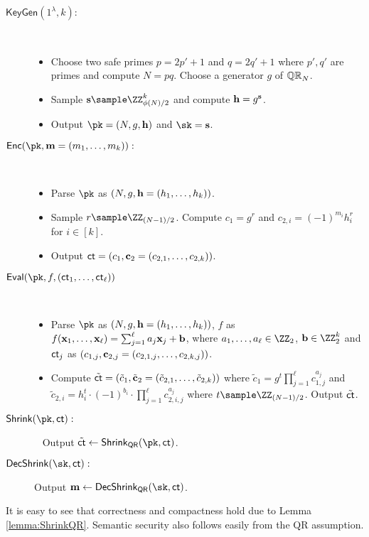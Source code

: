 \begin{description}
\item[$\mathsf{KeyGen}(1^\lambda,k):$]~
\begin{itemize}
    \item Choose two safe primes $p=2p'+1$ and $q=2q'+1$ where $p',q'$ are primes and compute $N=pq$. Choose a generator $g$ of $\mathbb{QR}_N$.
    \item Sample $\sn\sample \ZZ_{\phi(N)/2}^k$ and compute $\mathbf{h}=g^{\mathbf{s}}$.
    \item Output $\pk=(N,g,\hn)$ and $\sk=\sn$.
\end{itemize}

\item[$\mathsf{Enc}(\pk,\mn=(m_1,\dots, m_k)):$]~
\begin{itemize}
    \item Parse $\pk$ as $(N,g,\mathbf{h}=(h_1,\dots ,h_k))$.
    \item Sample $r\sample \ZZ_{(N-1)/2}$. Compute $c_1=g^r$ and $c_{2,i}=(-1)^{m_i}h_i^r$ for $i\in[k]$.
    \item Output $\mathsf{ct}=(c_1,\mathbf{c}_2=(c_{2,1},\dots,c_{2,k}) )$.
\end{itemize}

\item[$\mathsf{Eval}(\pk,f, (\ct_1,\dots, \ct_\ell))$]~
\begin{itemize}
    \item Parse $\pk$ as $(N,g,\mathbf{h}=(h_1,\dots ,h_k))$, $f$ as $f(\mathbf{x}_1,\dots, \mathbf{x}_\ell)=\sum_{j=1}^\ell a_j\mathbf{x}_j+\mathbf{b}$, where $a_1,\dots,a_\ell\in \ZZ_2$, $\bn\in\ZZ_2^k$ and $\mathsf{ct}_j$ as $(c_{1,j},\mathbf{c}_{2,j}=(c_{2,1,j},\dots,c_{2,k,j}) )$.%
    \item Compute $\tilde {\mathsf{ct}}=(\tilde c_1,\tilde {\mathbf{c}}_2=(\tilde c_{2,1},\dots,\tilde c_{2,k} ))$ where $\tilde c_1=g^t\prod_{j=1}^\ell c_{1,j}^{a_j}$ and $\tilde c_{2,i}=h_i^t\cdot(-1)^{b_i}\cdot\prod_{j=1}^\ell c_{2,i,j}^{a_j}$ where $t\sample \ZZ_{(N-1)/2}$.  Output $\tilde {\mathsf{ct}}$.
\end{itemize}

\item[$\mathsf{Shrink}(\pk,\ct):$]~ Output $\tilde \ct\leftarrow\mathsf{Shrink}_\mathsf{QR}(\pk,\ct)$.

\item[$\mathsf{DecShrink}(\sk,\ct):$] Output $\mn\leftarrow\mathsf{DecShrink}_\mathsf{QR}(\sk,\ct)$. 
\end{description}

It is easy to see that correctness and compactness hold due to Lemma \ref{lemma:ShrinkQR}. Semantic security also follows easily from the QR assumption.


